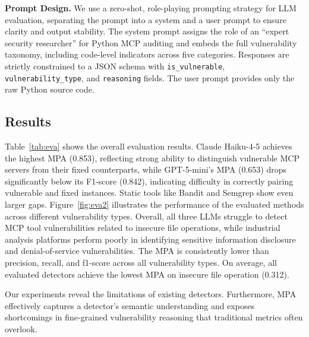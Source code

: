\textbf{Prompt Design.} We use a zero-shot, role-playing prompting strategy for LLM evaluation, separating the prompt into a system and a user prompt to ensure clarity and output stability. The system prompt assigns the role of an “expert security researcher” for Python MCP auditing and embeds the full vulnerability taxonomy, including code-level indicators across five categories. Responses are strictly constrained to a JSON schema with \texttt{is\_vulnerable}, \texttt{vulnerability\_type}, and \texttt{reasoning} fields. The user prompt provides only the raw Python source code.


\subsection{Results}


Table~\ref{tab:eva} shows the overall evaluation results. Claude Haiku-4-5 achieves the highest MPA (0.853), reflecting strong ability to distinguish vulnerable MCP servers from their fixed counterparts, while GPT-5-mini's MPA (0.653) drops significantly below its F1-score (0.842), indicating difficulty in correctly pairing vulnerable and fixed instances. Static tools like Bandit and Semgrep show even larger gaps. Figure~\ref{fig:eva2} illustrates the performance of the evaluated methods across different vulnerability types. Overall, all three LLMs struggle to detect MCP tool vulnerabilities related to insecure file operations, while industrial analysis platforms perform poorly in identifying sensitive information disclosure and denial-of-service vulnerabilities. The MPA is consistently lower than precision, recall, and f1-score across all vulnerability types. On average, all evaluated detectors achieve the lowest MPA on insecure file operation (0.312). 

Our experiments reveal the limitations of existing detectors. Furthermore, MPA effectively captures a detector's semantic understanding and exposes shortcomings in fine-grained vulnerability reasoning that traditional metrics often overlook.


